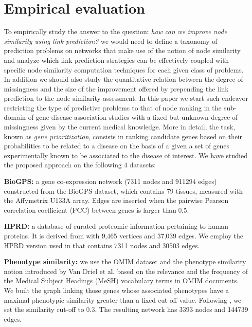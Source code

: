 
\section{Empirical evaluation} \label{evaluation} 

To empirically study the answer to the question: {\em how can we improve node
similarity using link prediction?} we would need to define a taxonomy of
prediction problems on networks that make use of the notion of node similarity
and analyze which link prediction strategies can be effectively coupled with
specific node similarity computation techniques for each given class of
problems. In addition we should also study the quantitative relation between
the degree of missingness and the size of the improvement offered by
prepending the link prediction to the node similarity assessment. In this
paper we start such endeavor restricting the type of predictive problems to
that of node ranking in the sub-domain of gene-disease association studies
with a fixed but unknown degree of missingness given by the current medical
knowledge. More in detail, the task, known as {\em gene prioritization},
consists in ranking candidate genes based on their probabilities to be related
to a disease on the basis of a given a set of genes experimentally known to be
associated to the disease of interest. We have studied the proposed approach on the
following 4 datasets:

\textbf{BioGPS:} a gene co-expression network (7311 nodes and 911294 edges) 
constructed from the BioGPS dataset, which contains 79 tissues, measured with
the Affymetrix U133A array. Edges are inserted when the pairwise Pearson
correlation coefficient (PCC) between genes is larger than 0.5.

\textbf{HPRD:} a database of curated proteomic information pertaining to
human proteins. It is derived from \cite{jour5} with 9,465 vertices and 37,039
edges. We employ the HPRD version used in \cite{jour6} that contains 7311 nodes and 30503 edges. %

\textbf{Phenotype similarity:} we use the OMIM \cite{jour4} dataset and the
phenotype similarity notion introduced by Van Driel et al. \cite{jour5} based on the relevance and the frequency of
the Medical Subject Headings (MeSH) vocabulary terms in OMIM documents. We built the graph linking those
genes whose associated phenotypes have a maximal phenotypic similarity greater
than a fixed cut-off value. Following \cite{jour5}, we set the
similarity cut-off to $0.3$. The resulting network has 3393 nodes and 144739 edges.

